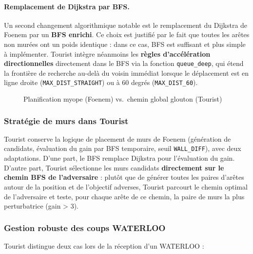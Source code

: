 \documentclass[12pt,a4paper]{article}
\begin{document}
\paragraph{Remplacement de Dijkstra par BFS.}
Un second changement algorithmique notable est le remplacement du Dijkstra 
de Foenem par un \textbf{BFS enrichi}. Ce choix est justifié par le fait que 
toutes les arêtes non murées ont un poids identique : dans ce cas, BFS est 
suffisant et plus simple à implémenter. Tourist intègre néanmoins les 
\textbf{règles d'accélération directionnelles} directement dans le BFS via 
la fonction \texttt{queue\_deep}, qui étend la frontière de recherche au-delà 
du voisin immédiat lorsque le déplacement est en ligne droite 
(\texttt{MAX\_DIST\_STRAIGHT}) ou à 60 degrés (\texttt{MAX\_DIST\_60}).

\begin{figure}[h]
\centering
\caption{Planification myope (Foenem) vs.\ chemin global glouton (Tourist)}
\end{figure}


\subsubsection{Stratégie de murs dans Tourist}

Tourist conserve la logique de placement de murs de Foenem (génération de 
candidats, évaluation du gain par BFS temporaire, seuil \texttt{WALL\_DIFF}), 
avec deux adaptations. D'une part, le BFS remplace Dijkstra pour l'évaluation 
du gain. D'autre part, Tourist sélectionne les murs candidats \textbf{directement 
sur le chemin BFS de l'adversaire} : plutôt que de générer toutes les paires 
d'arêtes autour de la position et de l'objectif adverses, Tourist parcourt le 
chemin optimal de l'adversaire et teste, pour chaque arête de ce chemin, 
la paire de murs la plus perturbatrice (gain > 3).

\subsubsection{Gestion robuste des coups WATERLOO}

Tourist distingue deux cas lors de la réception d'un WATERLOO :
\end{document}
